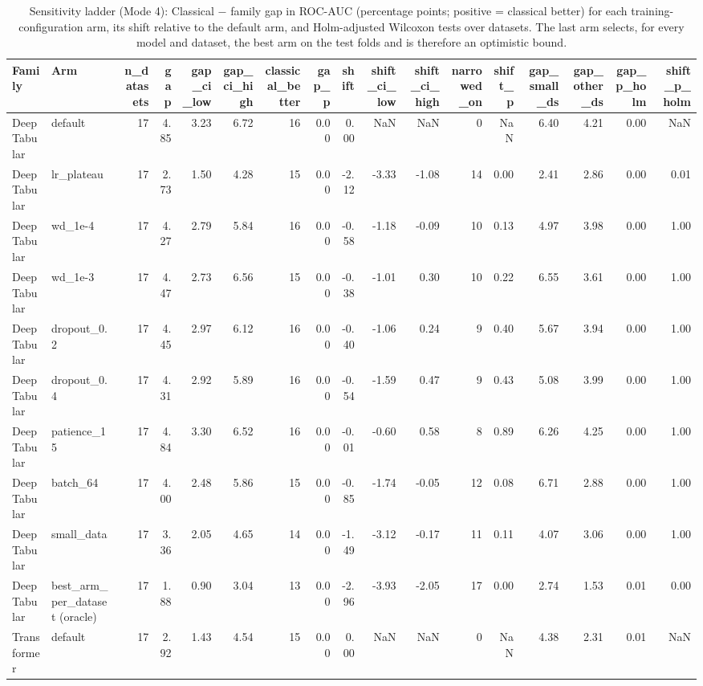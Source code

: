 \begin{table}
\caption{Sensitivity ladder (Mode 4): Classical $-$ family gap in ROC-AUC (percentage points; positive = classical better) for each training-configuration arm, its shift relative to the default arm, and Holm-adjusted Wilcoxon tests over datasets. The last arm selects, for every model and dataset, the best arm on the test folds and is therefore an optimistic bound.}
\label{tab:r32_ladder}
\begin{tabular}{llrrrrrrrrrrrrrrr}
\toprule
Family & Arm & n\_datasets & gap & gap\_ci\_low & gap\_ci\_high & classical\_better & gap\_p & shift & shift\_ci\_low & shift\_ci\_high & narrowed\_on & shift\_p & gap\_small\_ds & gap\_other\_ds & gap\_p\_holm & shift\_p\_holm \\
\midrule
DeepTabular & default & 17 & 4.85 & 3.23 & 6.72 & 16 & 0.00 & 0.00 & NaN & NaN & 0 & NaN & 6.40 & 4.21 & 0.00 & NaN \\
DeepTabular & lr\_plateau & 17 & 2.73 & 1.50 & 4.28 & 15 & 0.00 & -2.12 & -3.33 & -1.08 & 14 & 0.00 & 2.41 & 2.86 & 0.00 & 0.01 \\
DeepTabular & wd\_1e-4 & 17 & 4.27 & 2.79 & 5.84 & 16 & 0.00 & -0.58 & -1.18 & -0.09 & 10 & 0.13 & 4.97 & 3.98 & 0.00 & 1.00 \\
DeepTabular & wd\_1e-3 & 17 & 4.47 & 2.73 & 6.56 & 15 & 0.00 & -0.38 & -1.01 & 0.30 & 10 & 0.22 & 6.55 & 3.61 & 0.00 & 1.00 \\
DeepTabular & dropout\_0.2 & 17 & 4.45 & 2.97 & 6.12 & 16 & 0.00 & -0.40 & -1.06 & 0.24 & 9 & 0.40 & 5.67 & 3.94 & 0.00 & 1.00 \\
DeepTabular & dropout\_0.4 & 17 & 4.31 & 2.92 & 5.89 & 16 & 0.00 & -0.54 & -1.59 & 0.47 & 9 & 0.43 & 5.08 & 3.99 & 0.00 & 1.00 \\
DeepTabular & patience\_15 & 17 & 4.84 & 3.30 & 6.52 & 16 & 0.00 & -0.01 & -0.60 & 0.58 & 8 & 0.89 & 6.26 & 4.25 & 0.00 & 1.00 \\
DeepTabular & batch\_64 & 17 & 4.00 & 2.48 & 5.86 & 15 & 0.00 & -0.85 & -1.74 & -0.05 & 12 & 0.08 & 6.71 & 2.88 & 0.00 & 1.00 \\
DeepTabular & small\_data & 17 & 3.36 & 2.05 & 4.65 & 14 & 0.00 & -1.49 & -3.12 & -0.17 & 11 & 0.11 & 4.07 & 3.06 & 0.00 & 1.00 \\
DeepTabular & best\_arm\_per\_dataset (oracle) & 17 & 1.88 & 0.90 & 3.04 & 13 & 0.00 & -2.96 & -3.93 & -2.05 & 17 & 0.00 & 2.74 & 1.53 & 0.01 & 0.00 \\
Transformer & default & 17 & 2.92 & 1.43 & 4.54 & 15 & 0.00 & 0.00 & NaN & NaN & 0 & NaN & 4.38 & 2.31 & 0.01 & NaN \\

\end{tabular}
\end{table}
